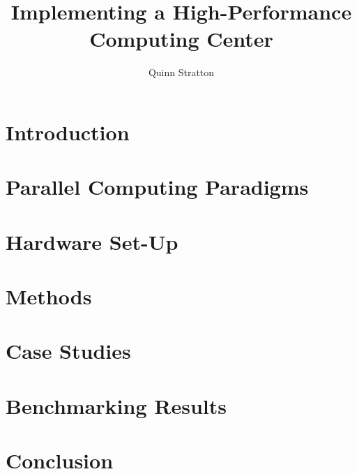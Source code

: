 \documentclass{article}
\title{Implementing a High-Performance Computing Center}
\author{Quinn Stratton}
\date{}
\numberwithin{pic}{section}
\numberwithin{lem}{section}
\numberwithin{thm}{section}
\numberwithin{cor}{section}
\theoremstyle{definition}
\numberwithin{ex}{section}
\numberwithin{defn}{section}
\theoremstyle{remark}
\begin{document}
\maketitle
\tableofcontents

\section{Introduction}

\section{Parallel Computing Paradigms}

\section{Hardware Set-Up} %

\section{Methods}

\section{Case Studies} %

\section{Benchmarking Results}

\section{Conclusion}
\end{document}
